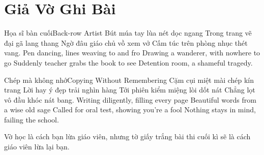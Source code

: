 \chapter{Giả Vờ Ghi Bài}

\begin{tutuyetbox}{Họa sĩ bàn cuối}{Back-row Artist}
Bút múa tay lùa nét dọc ngang
Trong trang vẽ đại gã lang thang
Ngờ đâu giáo chủ vồ xem vở
Cấm túc trên phòng nhục thét vang.
\tcblower
Pen dancing, lines weaving to and fro 
Drawing a wanderer, with nowhere to go 
Suddenly teacher grabs the book to see 
Detention room, a shameful tragedy.
\end{tutuyetbox}

\begin{tutuyetbox}{Chép mà không nhớ}{Copying Without Remembering}
Cặm cụi miệt mài chép kín trang
Lời hay ý đẹp trải nghìn hàng
Tới phiên kiểm miệng lòi dốt nát
Chẳng lọt vô đầu khóc nát bang.
\tcblower
Writing diligently, filling every page 
Beautiful words from a wise old sage 
Called for oral test, showing you're a fool 
Nothing stays in mind, failing the school.
\end{tutuyetbox}

\begin{ghichu}
Vờ học là cách bạn lừa giáo viên, nhưng tờ giấy trắng bài thi cuối kì sẽ là cách giáo viên lừa lại bạn.
\end{ghichu}